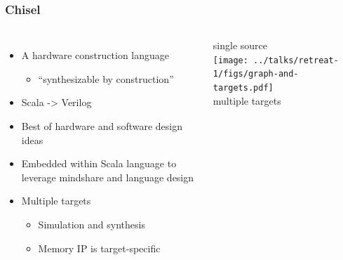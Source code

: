 \documentclass[xcolor=pdflatex,dvipsnames,table]{beamer}
\begin{document}
\begin{frame}[fragile]
\frametitle{Chisel}

\begin{columns}[c]


\begin{itemize}
\item A hardware construction language 
\begin{itemize}
\item ``synthesizable by construction''
\end{itemize}
\item {\color{red}{\bf Not} Scala -> Verilog}
\item Best of hardware and software design ideas
\item Embedded within Scala language to leverage mindshare and language design
\item Multiple targets
\begin{itemize}
\item Simulation and synthesis
\item Memory IP is target-specific
\end{itemize}
\end{itemize}


\begin{center}
single source \\
\texttt{[image: ../talks/retreat-1/figs/graph-and-targets.pdf]} \\
multiple targets \\
\end{center}

\end{columns}
\end{frame}
\end{document}
